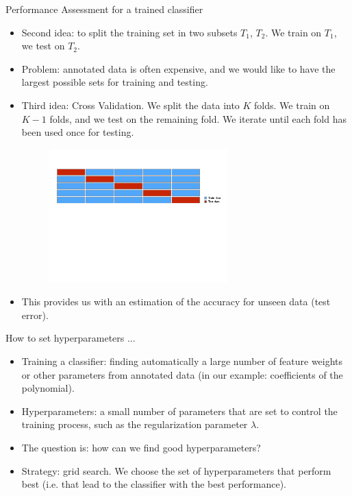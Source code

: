 \documentclass[xcolor=pdftex,dvipsnames,table]{beamer}
\begin{document}
\begin{frame}{Performance Assessment for a trained classifier}
	\begin{itemize}
		\item<1-> Second idea: to split the training set in two subsets $T_1$, $T_2$. We train on $T_1$, we test on $T_2$.
		\item<2-> Problem: annotated data is often expensive, and we would like to have the largest possible sets for training and testing.
		\item<3-> Third idea: Cross Validation. We split the data into $K$ folds. We train on $K-1$ folds, and we test on the remaining fold. We iterate until each fold has been used once for testing.
		\begin{figure}[htb]
			\includegraphics[width=0.65\textwidth]{../graphics/CV1.pdf}
		\end{figure}
		\item<4-> This provides us with an estimation of the accuracy for unseen data (test error).
	\end{itemize}
\end{frame}

\begin{frame}{How to set hyperparameters ... }
	\begin{itemize}
		\item Training a classifier: finding automatically a large number of feature weights or other parameters from annotated data (in our example: coefficients of the polynomial).
		\item Hyperparameters: a small number of parameters that are set to control the training process, such as the regularization parameter $\lambda$.
		\item The question is: how can we find good hyperparameters?
		\item Strategy: grid search. We choose the set of hyperparameters that perform best (i.e. that lead to the classifier with the best performance).
	\end{itemize}
\end{frame}
\end{document}
